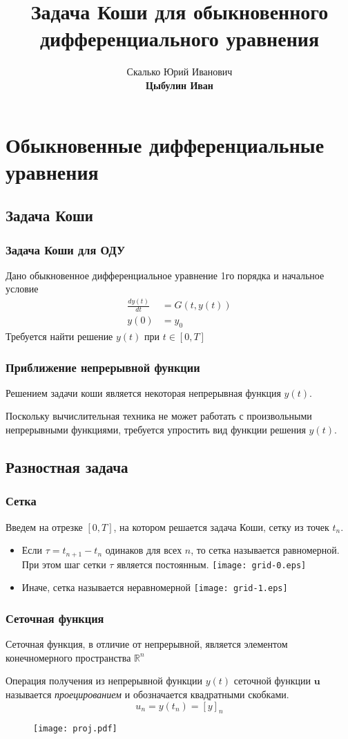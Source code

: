 \documentclass[apectratio=43,unicode]{beamer}
\title[Нелиненые уравнения]{Задача Коши для обыкновенного дифференциального уравнения}
\author[Цыбулин И.В.]{Скалько Юрий Иванович\\
\textbf{Цыбулин Иван}}
\date{}
\begin{document}
\begin{frame}[plain]
\titlepage
\end{frame}

\def\L{\mathcal{L}}

\section{Обыкновенные дифференциальные уравнения}
\subsection{Задача Коши}
\begin{frame}\frametitle{Задача Коши для ОДУ}
	Дано обыкновенное дифференциальное уравнение 1го порядка и начальное условие
	\begin{align*}
	\frac{dy(t)}{dt} &= G(t, y(t))\\
	y(0) &= y_0
	\end{align*}
	Требуется найти решение $y(t)$ при $t \in [0, T]$
\end{frame}

\begin{frame}\frametitle{Приближение непрерывной функции}
	Решением задачи коши является некоторая непрерывная функция $y(t)$.

	Поскольку вычислительная техника не может работать с произвольными непрерывными функциями,
	требуется упростить вид функции решения $y(t)$.
\end{frame}

\subsection{Разностная задача}
\begin{frame}\frametitle{Сетка}
	Введем на отрезке $[0, T]$, на котором решается задача Коши, сетку из точек $t_n$.
	\begin{itemize}
	\item Если $\tau = t_{n+1} - t_n$ одинаков для всех $n$, то сетка называется 
		равномерной. При этом шаг сетки $\tau$ является постоянным.
	\texttt{[image: grid-0.eps]}
	\item Иначе, сетка называется неравномерной
	\texttt{[image: grid-1.eps]}
	\end{itemize}
\end{frame}

\begin{frame}\frametitle{Сеточная функция}
	Сеточная функция, в отличие от непрерывной, является элементом конечномерного пространства $\mathbb{R}^n$

	Операция получения из непрерывной функции $y(t)$ сеточной функции $\mathbf{u}$ 
	называется \emph{проецированием} и обозначается квадратными скобками.
	$$
	u_n = y(t_n) = [y]_n
	$$
	\begin{figure}%
	\texttt{[image: proj.pdf]}%
	\end{figure}
\end{frame}
\end{document}
